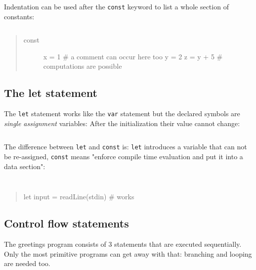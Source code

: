 Indentation can be used after the \texttt{const} keyword to list a whole
section of constants:

\begin{verbatim}
\end{verbatim}

\begin{quote}
\begin{description}
\item[const]
x = 1 \# a comment can occur here too y = 2 z = y + 5 \# computations
are possible
\end{description}
\end{quote}

\hypertarget{the-let-statement}{%
\subsection{The let statement}\label{the-let-statement}}

The \texttt{let} statement works like the \texttt{var} statement but the
declared symbols are \emph{single assignment} variables: After the
initialization their value cannot change:

\begin{verbatim}
\end{verbatim}

The difference between \texttt{let} and \texttt{const} is: \texttt{let}
introduces a variable that can not be re-assigned, \texttt{const} means
"enforce compile time evaluation and put it into a data section":

\begin{verbatim}
\end{verbatim}

\begin{verbatim}
\end{verbatim}

\begin{quote}
let input = readLine(stdin) \# works
\end{quote}

\hypertarget{control-flow-statements}{%
\subsection{Control flow statements}\label{control-flow-statements}}

The greetings program consists of 3 statements that are executed
sequentially. Only the most primitive programs can get away with that:
branching and looping are needed too.

